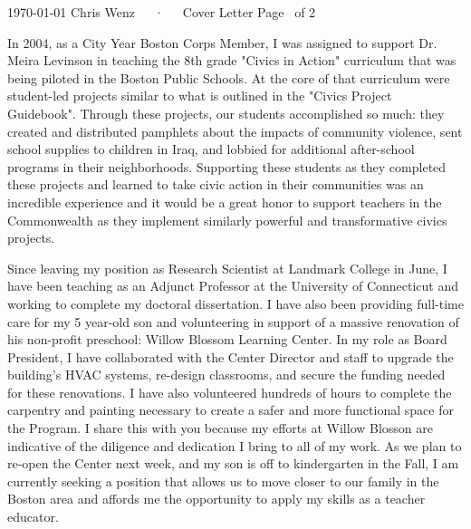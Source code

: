 \documentclass[11pt, a4paper]{awesome-cv}
\begin{document}
\makecvheader[C]

\makecvfooter
  {\today}
  {Chris Wenz~~~·~~~Cover Letter}
  {Page \thepage\ of 2}
\makelettertitle

\begin{cvletter}

In 2004, as a City Year Boston Corps Member, I was assigned to support Dr. Meira Levinson in teaching the 8th grade "Civics in Action" curriculum that was being piloted in the Boston Public Schools. At the core of that curriculum were student-led projects similar to what is outlined in the "Civics Project Guidebook". Through these projects, our students accomplished so much: they created and distributed pamphlets about the impacts of community violence, sent school supplies to children in Iraq, and lobbied for additional after-school programs in their neighborhoods. Supporting these students as they completed these projects and learned to take civic action in their communities was an incredible experience and it would be a great honor to support teachers in the Commonwealth as they implement similarly powerful and transformative civics projects. 

Since leaving my position as Research Scientist at Landmark College in June, I have been teaching as an Adjunct Professor at the University of Connecticut and working to complete my doctoral dissertation. I have also been providing full-time care for my 5 year-old son and volunteering in support of a massive renovation of his non-profit preschool: Willow Blossom Learning Center. In my role as Board President, I have collaborated with the Center Director and staff to upgrade the building's HVAC systems, re-design classrooms, and secure the funding needed for these renovations. I have also volunteered hundreds of hours to complete the carpentry and painting necessary to create a safer and more functional space for the Program. I share this with you because my efforts at Willow Blosson are indicative of the diligence and dedication I bring to all of my work. As we plan to re-open the Center next week, and my son is off to kindergarten in the Fall, I am currently seeking a position that allows us to move closer to our family in the Boston area and affords me the opportunity to apply my skills as a teacher educator.  


\end{cvletter}
\end{document}
